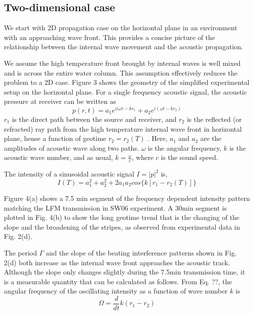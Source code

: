\subsection{Two-dimensional case}
We start with 2D propagation case on the horizontal plane in an environment with an approaching wave front. This provides a concise picture of the relationship between the internal wave movement and the acoustic propagation. %

We assume the high temperature front brought by internal waves is well mixed and is across the entire water column. This assumption effectively reduces the problem to a 2D case. Figure 3 shows the geometry of the simplified experimental setup on the horizontal plane. 
For a single frequency acoustic signal, the acoustic pressure at receiver can be written as
\begin{equation}\label{2D1}
p(r,t)=a_1e^{i(\omega t-kr_1}+a_2e^{i(\omega t-kr_2)}
\end{equation}
$r_1$ is the direct path between the source and receiver, and $r_2$ is the reflected (or refracted) ray path from the high temperature internal wave front in horizontal plane, hense a function of geotime $r_2=r_2(T)$ . Here, $a_1$  and $a_2$  are the amplitudes of acoustic wave along two paths. $\omega$  is the angular frequency,  $k$ is the acoustic wave number, and as usual,  $k=
\frac{\omega}{c}$,  where $c$ is the sound speed. 

The intensity of a sinusoidal acoustic signal $I=|p|^2$ is, 
\begin{equation}\label{2D2}
I(T)=a_1^2+a_2^2+2a_1a_2cos\{k[r_1-r_2(T)]\}
\end{equation}

Figure 4(a) shows a 7.5 min segment of the frequency dependent intensity pattern matching the LFM transmission in SW06 experiment. A 30min segment is plotted in Fig. 4(b) to show the long geotime trend that is the changing of the slope and the broadening of the stripes, as observed from experimental data in Fig. 2(d).

The period $ \Gamma$ and the slope of the beating interference patterns shown in Fig. 2(d) both increase as the internal wave front approaches the acoustic track. Although the slope only changes slightly during the 7.5min transmission time, it is a measurable quantity that can be calculated as follows. From Eq. ??, the angular frequency of the oscillating intensity as a function of  wave number $k$  is
\begin{equation}\label{2Dfreq1}
\Omega=\frac{d}{dt}k(r_1-r_2)
\end{equation}

